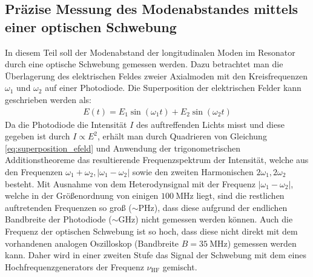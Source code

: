 \documentclass[11pt, a4paper]{article}
\numberwithin{equation}{section}
\begin{document}
\subsection{Präzise Messung des Modenabstandes mittels einer optischen Schwebung}
In diesem Teil soll der Modenabstand der longitudinalen Moden im Resonator durch eine optische Schwebung gemessen werden.
Dazu betrachtet man die Überlagerung des elektrischen Feldes zweier Axialmoden mit den Kreisfrequenzen $\omega_1$ und $\omega_2$ auf einer Photodiode.
Die Superposition der elektrischen Felder kann geschrieben werden als:
\begin{align}
	E(t) = E_1 \sin(\omega_1 t) + E_2 \sin(\omega_2 t)
	\label{eq:superposition_efeld}
\end{align}
Da die Photodiode die Intensität $I$ des auftreffenden Lichts misst und diese gegeben ist durch $I \propto E^2$, erhält man durch Quadrieren von Gleichung \ref{eq:superposition_efeld} und Anwendung der trigonometrischen Additionstheoreme das resultierende Frequenzspektrum der Intensität, welche aus den Frequenzen $\omega_1 + \omega_2, |\omega_1 - \omega_2|$ sowie den zweiten Harmonischen $2\omega_1, 2\omega_2$ besteht.
Mit Ausnahme von dem Heterodynsignal mit der Frequenz $|\omega_1 - \omega_2|$, welche in der Größenordnung von einigen $\SI{100}{\mega\hertz}$ liegt, sind die restlichen auftretenden Frequenzen so groß ($\sim \si{\peta\hertz}$), dass diese aufgrund der endlichen Bandbreite der Photodiode ($\sim \si{\giga\hertz}$) nicht gemessen werden können.
Auch die Frequenz der optischen Schwebung ist so hoch, dass diese nicht direkt mit dem vorhandenen analogen Oszilloskop (Bandbreite $B = \SI{35}{\mega\hertz}$) gemessen werden kann.
Daher wird in einer zweiten Stufe das Signal der Schwebung mit dem eines Hochfrequenzgenerators der Frequenz $\nu_\mathrm{HF}$ gemischt.
\end{document}
